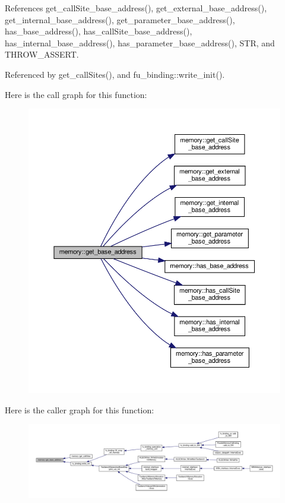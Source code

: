References get\+\_\+call\+Site\+\_\+base\+\_\+address(), get\+\_\+external\+\_\+base\+\_\+address(), get\+\_\+internal\+\_\+base\+\_\+address(), get\+\_\+parameter\+\_\+base\+\_\+address(), has\+\_\+base\+\_\+address(), has\+\_\+call\+Site\+\_\+base\+\_\+address(), has\+\_\+internal\+\_\+base\+\_\+address(), has\+\_\+parameter\+\_\+base\+\_\+address(), S\+TR, and T\+H\+R\+O\+W\+\_\+\+A\+S\+S\+E\+RT.



Referenced by get\+\_\+call\+Sites(), and fu\+\_\+binding\+::write\+\_\+init().

Here is the call graph for this function\+:
\nopagebreak
\begin{figure}[H]
\begin{center}
\leavevmode
\includegraphics[width=350pt]{d8/d99/classmemory_a1ea5eb40b241fab9c4512b828223ea92_cgraph}
\end{center}
\end{figure}
Here is the caller graph for this function\+:
\nopagebreak
\begin{figure}[H]
\begin{center}
\leavevmode
\includegraphics[width=350pt]{d8/d99/classmemory_a1ea5eb40b241fab9c4512b828223ea92_icgraph}
\end{center}
\end{figure}
\mbox{\label{classmemory_ac82303660a64f1638acd37265f20a48a}} 
